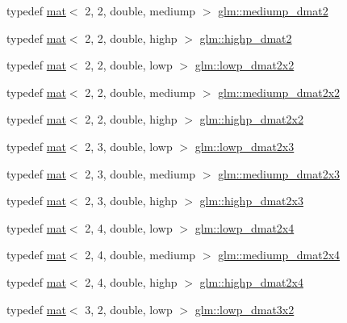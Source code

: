 \begin{DoxyCompactItemize}
\item 
typedef \hyperlink{structglm_1_1mat}{mat}$<$ 2, 2, double, mediump $>$ \hyperlink{group__core__precision_gadbf2ed2cfb596bd2ca7e980777c0acde}{glm\+::mediump\+\_\+dmat2}
\item 
typedef \hyperlink{structglm_1_1mat}{mat}$<$ 2, 2, double, highp $>$ \hyperlink{group__core__precision_ga10defb0dfd989f948d6783e2ca3889d3}{glm\+::highp\+\_\+dmat2}
\item 
typedef \hyperlink{structglm_1_1mat}{mat}$<$ 2, 2, double, lowp $>$ \hyperlink{group__core__precision_gaa0f01b1fb1a32ca63036ee3de89681d4}{glm\+::lowp\+\_\+dmat2x2}
\item 
typedef \hyperlink{structglm_1_1mat}{mat}$<$ 2, 2, double, mediump $>$ \hyperlink{group__core__precision_ga3d91f269872b4664d2f500b6dee986eb}{glm\+::mediump\+\_\+dmat2x2}
\item 
typedef \hyperlink{structglm_1_1mat}{mat}$<$ 2, 2, double, highp $>$ \hyperlink{group__core__precision_gad08aec6bf6b5ae7d486fbabb3b28f904}{glm\+::highp\+\_\+dmat2x2}
\item 
typedef \hyperlink{structglm_1_1mat}{mat}$<$ 2, 3, double, lowp $>$ \hyperlink{group__core__precision_gae5263863de4793ff33184db9a6bd3620}{glm\+::lowp\+\_\+dmat2x3}
\item 
typedef \hyperlink{structglm_1_1mat}{mat}$<$ 2, 3, double, mediump $>$ \hyperlink{group__core__precision_gaf3a6e61247ffcbbf9211186d0d250a2b}{glm\+::mediump\+\_\+dmat2x3}
\item 
typedef \hyperlink{structglm_1_1mat}{mat}$<$ 2, 3, double, highp $>$ \hyperlink{group__core__precision_gad7de433cb7f79959a191fc5c64fbfc4e}{glm\+::highp\+\_\+dmat2x3}
\item 
typedef \hyperlink{structglm_1_1mat}{mat}$<$ 2, 4, double, lowp $>$ \hyperlink{group__core__precision_ga7832375b36ade5886dd947a2a378d1ac}{glm\+::lowp\+\_\+dmat2x4}
\item 
typedef \hyperlink{structglm_1_1mat}{mat}$<$ 2, 4, double, mediump $>$ \hyperlink{group__core__precision_ga20d1a647a3ef0083e306d026c77ac906}{glm\+::mediump\+\_\+dmat2x4}
\item 
typedef \hyperlink{structglm_1_1mat}{mat}$<$ 2, 4, double, highp $>$ \hyperlink{group__core__precision_gaea7c625705d849f1a55c9bfcb2585875}{glm\+::highp\+\_\+dmat2x4}
\item 
typedef \hyperlink{structglm_1_1mat}{mat}$<$ 3, 2, double, lowp $>$ \hyperlink{group__core__precision_gae774d40dc418c39f5ef4dcf4deac0e3c}{glm\+::lowp\+\_\+dmat3x2}
\item 

\end{DoxyCompactItemize}
